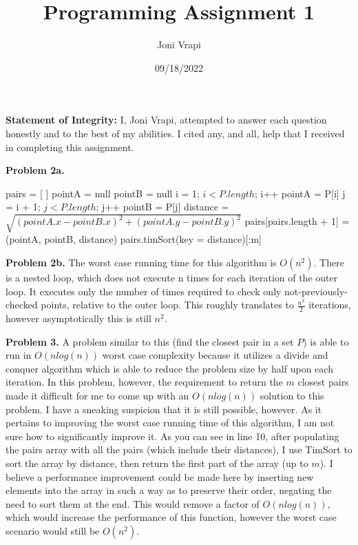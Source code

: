 \documentclass{article}
\title{Programming Assignment 1}
\author{Joni Vrapi}
\date{09/18/2022}
\begin{document}
\maketitle

\textbf{Statement of Integrity:} I, Joni Vrapi, attempted to answer each question honestly and to the best of my abilities. I cited any, and all, help that I received in completing this assignment.

\hfill

\textbf{Problem 2a.}

\begin{codebox}
    \li pairs = [ ]
    \li pointA = null
    \li pointB = null
    \li \For i = 1; $i < P.length$; i++ \Do
        \li pointA = P[i]
        \li \For j = i + 1; $j < P.length$; j++ \Do
        \li pointB = P[j]
        \li distance = $\sqrt{(pointA.x - pointB.x)^2 + (pointA.y - pointB.y)^2}$
        \li pairs[pairs.length + 1] = (pointA, pointB, distance)
        \li \Return pairs.timSort(key = distance)[:m]
            \End
        \End
\end{codebox}

\hfill

\textbf{Problem 2b.} The worst case running time for this algorithm is $O(n^2)$. There is a nested loop, which does not execute n times for each iteration of the outer loop. It executes only the number of times required to check only not-previously-checked points, relative to the outer loop. This roughly translates to $\frac{n^2}{2}$ iterations, however asymptotically this is still $n^2$.

\hfill

\textbf{Problem 3.} A problem similar to this (find the closest pair in a set $P$) is able to run in $O(nlog(n))$ worst case complexity because it utilizes a divide and conquer algorithm which is able to reduce the problem size by half upon each iteration. In this problem, however, the requirement to return the $m$ closest pairs made it difficult for me to come up with an $O(nlog(n))$ solution to this problem. I have a sneaking suspicion that it is still possible, however. As it pertains to improving the worst case running time of this algorithm, I am not sure how to significantly improve it. As you can see in line 10, after populating the pairs array with all the pairs (which include their distances), I use TimSort to sort the array by distance, then return the first part of the array (up to $m$). I believe a performance improvement could be made here by inserting new elements into the array in such a way as to preserve their order, negating the need to sort them at the end. This would remove a factor of $O(nlog(n))$, which would increase the performance of this function, however the worst case scenario would still be $O(n^2)$.

\newpage
 

\end{document}

